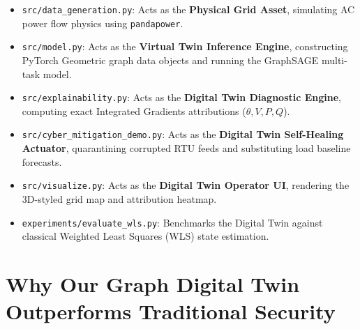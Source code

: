 \documentclass[11pt,a4paper]{article}
\begin{document}
\begin{itemize}
    \item \texttt{src/data\_generation.py}: Acts as the \textbf{Physical Grid Asset}, simulating AC power flow physics using \texttt{pandapower}.
    \item \texttt{src/model.py}: Acts as the \textbf{Virtual Twin Inference Engine}, constructing PyTorch Geometric graph data objects and running the GraphSAGE multi-task model.
    \item \texttt{src/explainability.py}: Acts as the \textbf{Digital Twin Diagnostic Engine}, computing exact Integrated Gradients attributions ($\theta, V, P, Q$).
    \item \texttt{src/cyber\_mitigation\_demo.py}: Acts as the \textbf{Digital Twin Self-Healing Actuator}, quarantining corrupted RTU feeds and substituting load baseline forecasts.
    \item \texttt{src/visualize.py}: Acts as the \textbf{Digital Twin Operator UI}, rendering the 3D-styled grid map and attribution heatmap.
    \item \texttt{experiments/evaluate\_wls.py}: Benchmarks the Digital Twin against classical Weighted Least Squares (WLS) state estimation.
\end{itemize}

\section{Why Our Graph Digital Twin Outperforms Traditional Security}

\begin{table}[htbp]
  \centering
\end{table}
\end{document}
